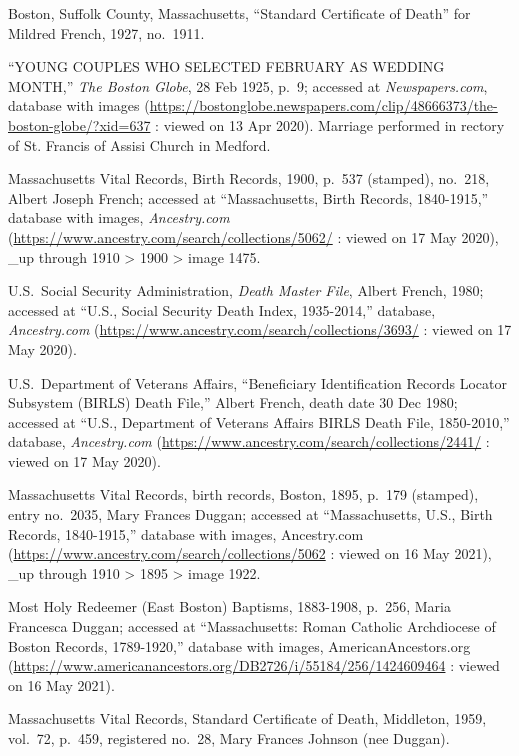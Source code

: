 \begin{thebibliography}{999}
Boston, Suffolk County, Massachusetts, ``Standard Certificate of Death'' for Mildred French, 1927, no.\ 1911.

``YOUNG COUPLES WHO SELECTED FEBRUARY AS WEDDING MONTH,'' \textit{The Boston Globe}, 28 Feb 1925, p.\ 9; accessed at \textit{Newspapers.com}, database with images (\url{https://bostonglobe.newspapers.com/clip/48666373/the-boston-globe/?xid=637} : viewed on 13 Apr 2020). Marriage performed in rectory of St. Francis of Assisi Church in Medford.

Massachusetts Vital Records, Birth Records, 1900, p.\ 537 (stamped), no.\ 218, Albert Joseph French; accessed at ``Massachusetts, Birth Records, 1840-1915,'' database with images, \textit{Ancestry.com} (\url{https://www.ancestry.com/search/collections/5062/} : viewed on 17 May 2020), \_up through 1910 > 1900 > image 1475.

U.S.\ Social Security Administration, \textit{Death Master File}, Albert French, 1980; accessed at ``U.S., Social Security Death Index, 1935-2014,'' database, \textit{Ancestry.com} (\url{https://www.ancestry.com/search/collections/3693/} : viewed on 17 May 2020).

U.S.\ Department of Veterans Affairs, ``Beneficiary Identification Records Locator Subsystem (BIRLS) Death File,'' Albert French, death date 30 Dec 1980; accessed at ``U.S., Department of Veterans Affairs BIRLS Death File, 1850-2010,'' database, \textit{Ancestry.com} (\url{https://www.ancestry.com/search/collections/2441/} : viewed on 17 May 2020).


Massachusetts Vital Records, birth records, Boston, 1895, p.\ 179 (stamped), entry no.\ 2035, Mary Frances Duggan; accessed at ``Massachusetts, U.S., Birth Records, 1840-1915,'' database with images, Ancestry.com (\url{https://www.ancestry.com/search/collections/5062} : viewed on 16 May 2021), \_up through 1910 > 1895 > image 1922.

Most Holy Redeemer (East Boston) Baptisms, 1883-1908, p.\ 256, Maria Francesca Duggan; accessed at ``Massachusetts: Roman Catholic Archdiocese of Boston Records, 1789-1920,'' database with images, AmericanAncestors.org (\url{https://www.americanancestors.org/DB2726/i/55184/256/1424609464} : viewed on 16 May 2021).

Massachusetts Vital Records, Standard Certificate of Death, Middleton, 1959, vol.\ 72, p.\ 459, registered no.\ 28, Mary Frances Johnson (nee Duggan).


\end{thebibliography}
